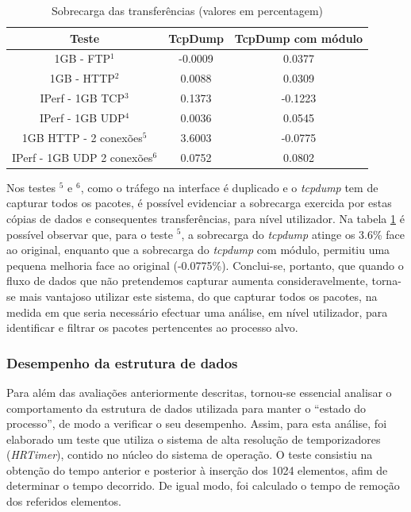 \documentclass[a4paper]{llncs}
\begin{document}
\vspace{-0.5cm}
\begin{table}
\begin{center}
\caption{Sobrecarga das transferências (valores em percentagem)}
\begin{tabular}{ | c | c | c |}
\hline
Teste & \hspace {0.3cm} TcpDump \hspace {0.3cm} & TcpDump com módulo  \\

\hline
1GB - FTP$^{1}$ & -0.0009  & 0.0377  \\
1GB - HTTP$^{2}$ & 0.0088 &  0.0309   \\
IPerf - 1GB TCP$^{3}$ & 0.1373 &  -0.1223   \\
IPerf - 1GB UDP$^{4}$ & 0.0036 & 0.0545 \\
\hline
\hline
1GB HTTP - 2 conexões$^{5}$ & 3.6003 & -0.0775   \\
IPerf - 1GB UDP 2 conexões$^{6}$ & 0.0752 & 0.0802   \\
\hline
\end{tabular}
\label{tab:overhead}
\end{center}
\end{table}
\vspace{-0.3cm}

Nos testes $^{5}$ e $^{6}$, como o tráfego na interface é duplicado e o \textit{tcpdump} tem de capturar todos os pacotes, é possível evidenciar a sobrecarga exercida por estas cópias de dados e consequentes transferências, para nível utilizador.
 Na tabela \ref{tab:overhead} é possível observar que, para o teste $^{5}$, a sobrecarga do \textit{tcpdump} atinge os 3.6\% face ao original, enquanto que a sobrecarga do \textit{tcpdump} com módulo, permitiu uma pequena melhoria face ao original (-0.0775\%).
 Conclui-se, portanto, que quando o fluxo de dados que não pretendemos capturar aumenta consideravelmente, torna-se mais vantajoso utilizar este sistema, do que capturar todos os pacotes, na medida em que seria necessário efectuar uma análise, em nível utilizador, para identificar e filtrar os pacotes pertencentes ao processo alvo.

\subsubsection{Desempenho da estrutura de dados}

Para além das avaliações anteriormente descritas, tornou-se essencial analisar o comportamento da estrutura de dados utilizada para manter o “estado do processo”, de modo a verificar o seu desempenho. 
 Assim, para esta análise, foi elaborado um teste que utiliza o sistema de alta resolução de temporizadores (\textit{HRTimer}), contido no núcleo do sistema de operação.
 O teste consistiu na obtenção do tempo anterior e posterior à inserção dos 1024 elementos, afim de determinar o tempo decorrido.
 De igual modo, foi calculado o tempo de remoção dos referidos elementos.
\end{document}
